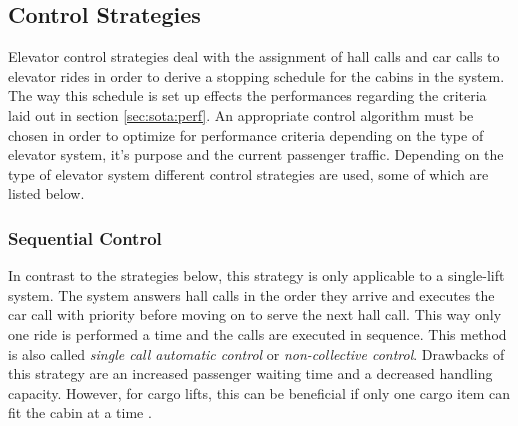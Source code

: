 

\subsection{Control Strategies}
\label{sec:sota:strategies}

Elevator control strategies deal with the assignment of hall calls and car calls to elevator rides in order to derive a stopping schedule for the cabins in the system.
The way this schedule is set up effects
the performances regarding the criteria laid out in section \ref{sec:sota:perf}.
An appropriate control algorithm must be chosen in order to optimize for performance criteria
depending on the type of elevator system, it's  purpose and the current passenger traffic.
Depending on the type of elevator system different control strategies are used, some of which are listed below.

\subsubsection{Sequential Control}
In contrast to the strategies below, 
this strategy is only applicable to a single-lift system.
The system answers hall calls in the order they arrive 
and executes the car call with priority before moving on to serve the next hall call.
This way only one ride is performed a time and the calls are executed in sequence. This method is also called \emph{single call automatic control} or \emph{non-collective control}.
Drawbacks of this strategy are an increased passenger waiting time and a decreased handling capacity.
However, for cargo lifts, this can be beneficial if only one cargo item can fit the cabin at a time
\autocite[][p.~238]{barney2016handbook}.

